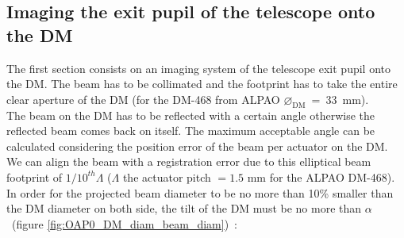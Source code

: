 \documentclass[12pt,a4paper]{article}
\begin{document}
\subsection{Imaging the exit pupil of the telescope onto the DM}
The first section consists on an imaging system of the telescope exit pupil onto the DM. The beam has to be collimated and the footprint has to take the entire clear aperture of the DM (for the DM-468 from ALPAO $\diameter_{\text{DM}}$~=~33~mm).\\
The beam on the DM has to be reflected with a certain angle otherwise the reflected beam comes back on itself. The maximum acceptable angle can be calculated considering the position error of the beam per actuator on the DM. We can align the beam with a registration error due to this elliptical beam footprint of $1/10^{th} \Lambda$ ($\Lambda$ the actuator pitch $= 1.5$ mm for the ALPAO DM-468). In order for the projected beam diameter to be no more than 10\% smaller than the DM diameter on both side, the tilt of the DM must be no more than $\alpha$~(figure \ref{fig:OAP0_DM_diam_beam_diam})~:
\end{document}
